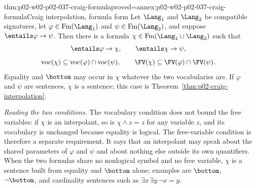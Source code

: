 \begin{hbtheorem}{thm:p02-w02-p02-037-craig-formula}{proved=annex:p02-w02-p02-037-craig-formula}{Craig interpolation, formula form}
Let \(\Lang_1\) and \(\Lang_2\) be compatible signatures, let
\(\varphi\in\operatorname{Fm}(\Lang_1)\) and \(\psi\in\operatorname{Fm}(\Lang_2)\), and suppose
\(\entails\varphi\to\psi\).  Then there is a formula
\(\chi\in\operatorname{Fm}(\Lang_1\cup\Lang_2)\) such that
\[
 \entails\varphi\to\chi,
 \qquad
 \entails\chi\to\psi,
\]
\[
 \operatorname{voc}(\chi)\subseteq
   \operatorname{voc}(\varphi)\cap\operatorname{voc}(\psi),
 \qquad
 \FV(\chi)\subseteq\FV(\varphi)\cap\FV(\psi).
\]
Equality and \(\bottom\) may occur in \(\chi\) whatever the two
vocabularies are.  If \(\varphi\) and \(\psi\) are sentences, \(\chi\) is a
sentence; this case is Theorem~\ref{thm:p02-craig-interpolation}.
\end{hbtheorem}

\emph{Reading the two conditions.}  The vocabulary condition does not bound
the free variables: if \(\chi\) is an interpolant, so is
\(\chi\land z=z\) for any variable \(z\), and its vocabulary is unchanged
because equality is logical.  The free-variable condition is therefore a
separate requirement.  It says that an interpolant may speak about the
shared parameters of \(\varphi\) and \(\psi\) and about nothing else
outside its own quantifiers.  When the two formulas share no nonlogical
symbol and no free variable, \(\chi\) is a sentence built from equality
and \(\bottom\) alone; examples are \(\bottom\), \(\neg\bottom\), and
cardinality sentences such as \(\exists x\,\exists y\,\neg x=y\).

